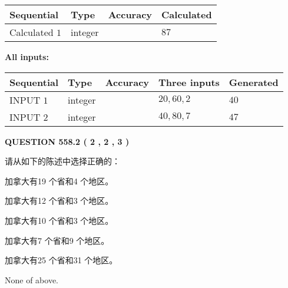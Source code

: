 \documentclass{ctexart}
\begin{document}
   
   
   
\noindent{}
   
   
  
  
\noindent\begin{tabular}{|l|l|l|l|}
\hline
 Sequential & Type & Accuracy & Calculated \\ 
\hline
 
 
  Calculated $  1 $ & integer &  & 
  $ 87 $ 
 \\  \hline  
 \end{tabular}
   
   
   
   
\noindent\vspace{0.1in}\hspace{-0.08in} {\textbf{\Large{All inputs: }}}
   
   
  
  
\noindent\begin{tabular}{|l|l|l|l|l|}
\hline
 Sequential & Type & Accuracy & Three inputs & Generated \\ 
\hline
 
 
  INPUT $  1 $ & integer &  & $
 20
 , 
 60
 , 
 2
 $ & $ 40 $ 
 \\  \hline  
 
 
  INPUT $  2 $ & integer &  & $
 40
 , 
 80
 , 
 7
 $ & $ 47 $ 
 \\  \hline  
 \end{tabular}
   
   
  
\vspace{0.2in}
  
{\textbf{\Large{QUESTION
558.2 
 ( 2 , 2 , 3 )
}}}
  
  
请从如下的陈述中选择正确的：
 
 
加拿大有19 个省和4 个地区。
 
 
加拿大有12 个省和3 个地区。
 
 
加拿大有10 个省和3 个地区。
 
 
加拿大有7 个省和9 个地区。
 
 
加拿大有25 个省和31 个地区。
 
 
 None of above.
 
 
\noindent{}
 
\end{document}
